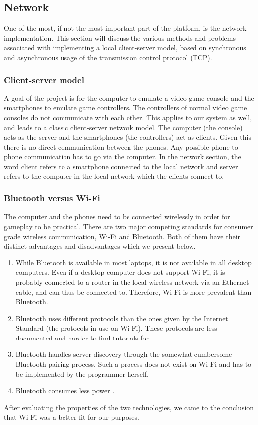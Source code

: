 \documentclass{article}
\begin{document}
\subsection{Network}
One of the most, if not the most important part of the platform, is the network implementation.
This section will discuss the various methods and problems associated with implementing a local
client-server model, based on synchronous and asynchronous usage of the transmission control
protocol (TCP).

\subsubsection{Client-server model}
A goal of the project is for the computer to emulate a video game console and the smartphones to
emulate game controllers. The controllers of normal video game consoles do not communicate
with each other. This applies to our system as well, and leads to a classic client-server network
model. The computer (the console) acts as the server and the smartphones (the controllers) act as
clients. Given this there is no direct communication between the phones. Any possible phone to
phone communication has to go via the computer. In the network section, the word client refers
to a smartphone connected to the local network and server refers to the computer in the local
network which the clients connect to.

\subsubsection{Bluetooth versus Wi-Fi}
The computer and the phones need to be connected wirelessly in order for gameplay to be
practical. There are two major competing standards for consumer grade wireless communication,
Wi-Fi and Bluetooth. Both of them have their distinct advantages and disadvantages which we
present below.
\begin{enumerate}
\item  While Bluetooth is available in most laptops, it is not available in all desktop computers.
Even if a desktop computer does not support Wi-Fi, it is probably connected to a router in
the local wireless network via an Ethernet cable, and can thus be connected to. Therefore,
Wi-Fi is more prevalent than Bluetooth.

\item Bluetooth uses different protocols than the ones given by the Internet Standard (the
protocols in use on Wi-Fi). These protocols are less documented and harder to find
tutorials for.

\item Bluetooth handles server discovery through the somewhat cumbersome Bluetooth pairing
process. Such a process does not exist on Wi-Fi and has to be implemented by the
programmer herself.

\item Bluetooth consumes less power \cite{key:5}.
\end{enumerate}
After evaluating the properties of the two technologies, we came to the conclusion that Wi-Fi
was a better fit for our purposes.
\end{document}
